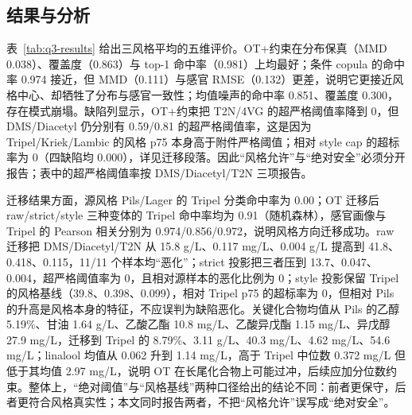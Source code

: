\subsection{结果与分析}

表~\ref{tab:q3-results} 给出三风格平均的五维评价。OT+约束在分布保真（MMD 0.038）、覆盖度（0.863）与 top-1 命中率（0.981）上均最好；条件 copula 的命中率 0.974 接近，但 MMD（0.111）与感官 RMSE（0.132）更差，说明它更接近风格中心、却牺牲了分布与感官一致性；均值噪声的命中率 0.851、覆盖度 0.300，存在模式崩塌。缺陷列显示，OT+约束把 T2N/4VG 的超严格阈值率降到 0，但 DMS/Diacetyl 仍分别有 0.59/0.81 的超严格阈值率，这是因为 Tripel/Kriek/Lambic 的风格 p75 本身高于附件严格阈值；相对 style cap 的超标率为 0（四缺陷均 0.000），详见迁移段落。因此“风格允许”与“绝对安全”必须分开报告；表中的超严格阈值率按 DMS/Diacetyl/T2N 三项报告。



迁移结果方面，源风格 Pils/Lager 的 Tripel 分类命中率为 0.00；OT 迁移后 raw/strict/style 三种变体的 Tripel 命中率均为 0.91（随机森林），感官画像与 Tripel 的 Pearson 相关分别为 0.974/0.856/0.972，说明风格方向迁移成功。raw 迁移把 DMS/Diacetyl/T2N 从 15.8 \textmu g/L、0.117 mg/L、0.004 \textmu g/L 提高到 41.8、0.418、0.115，11/11 个样本均“恶化”；strict 投影把三者压到 13.7、0.047、0.004，超严格阈值率为 0，且相对源样本的恶化比例为 0；style 投影保留 Tripel 的风格基线（39.8、0.398、0.099），相对 Tripel p75 的超标率为 0，但相对 Pils 的升高是风格本身的特征，不应误判为缺陷恶化。关键化合物均值从 Pils 的乙醇 5.19\%、甘油 1.64 g/L、乙酸乙酯 10.8 mg/L、乙酸异戊酯 1.15 mg/L、异戊醇 27.9 mg/L，迁移到 Tripel 的 8.79\%、3.11 g/L、40.3 mg/L、4.62 mg/L、54.6 mg/L；linalool 均值从 0.062 升到 1.14 mg/L，高于 Tripel 中位数 0.372 mg/L 但低于其均值 2.97 mg/L，说明 OT 在长尾化合物上可能过冲，后续应加分位数约束。整体上，“绝对阈值”与“风格基线”两种口径给出的结论不同：前者更保守，后者更符合风格真实性；本文同时报告两者，不把“风格允许”误写成“绝对安全”。

